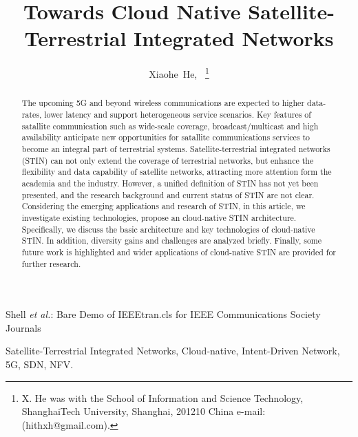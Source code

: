 \documentclass[12pt, draftclsnofoot, onecolumn]{IEEEtran}
\begin{document}
\tableofcontents
\title{Towards Cloud Native Satellite-Terrestrial Integrated Networks}
\author{Xiaohe~He,~
\thanks{X. He was with the School of Information and Science Technology, ShanghaiTech University, Shanghai, 201210 China e-mail: (hithxh@gmail.com).}%
}

%
{Shell \MakeLowercase{\textit{et al.}}: Bare Demo of IEEEtran.cls for IEEE Communications Society Journals}

\maketitle

\begin{abstract}
The upcoming 5G and beyond wireless communications are expected to higher data-rates, lower latency and support heterogeneous service scenarios. Key features of satallite communication such as wide-scale coverage, broadcast/multicast and high availability anticipate new opportunities for satallite communications services to become an integral part of terrestrial systems. Satellite-terrestrial integrated networks (STIN) can not only extend the coverage of terrestrial networks, but enhance the flexibility and data capability of satellite networks, attracting more attention form the academia and the industry. However, a unified definition of STIN has not yet been presented, and the research background and current status of STIN are not clear. Considering the emerging applications and research of STIN, in this article, we investigate existing technologies, propose an cloud-native STIN architecture. Specifically, we discuss the basic architecture and key technologies of cloud-native STIN. In addition, diversity gains and challenges are analyzed briefly. Finally, some future work is highlighted and wider applications of cloud-native STIN are provided for further research. 
\end{abstract}

\begin{IEEEkeywords}
Satellite-Terrestrial Integrated Networks, Cloud-native, Intent-Driven Network, 5G, SDN, NFV.
\end{IEEEkeywords}
%
\IEEEpeerreviewmaketitle
\end{document}
